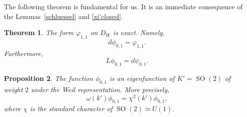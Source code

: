 \documentclass[12pt,leqno]{amsart}
\numberwithin{equation}{section}
\theoremstyle{plain}
\newtheorem{theorem}{Theorem}[section]
\newtheorem{proposition}[theorem]{Proposition}
\theoremstyle{definition}
\theoremstyle{remark}
\newcommand{\SO}{\operatorname{SO}}
\begin{document}
The following theorem is fundamental for us. It is an immediate consequence of the Lemmas~\ref{schluessel} and \ref{xi'closed}. 

\begin{theorem}\label{local-phi}
The form $\varphi_{1,1}$ on $D_W$ is exact. Namely,
\[
d \phi_{0,1} = \varphi_{1,1}.
\]
Furthermore,
\[
L \phi_{0,1} = d \psi_{0,1}.
\]
\end{theorem}

\begin{proposition}
The function $\phi_{0,1}$ is an eigenfunction of $K'=\SO(2)$ of weight $2$ under the Weil representation. More precisely,
\[
\omega(k') \phi_{0,1} =  \chi^2(k')\phi_{0,1},
\]
where $\chi$ is the standard character of $\SO(2) \simeq U(1)$.
\end{proposition}
\end{document}
